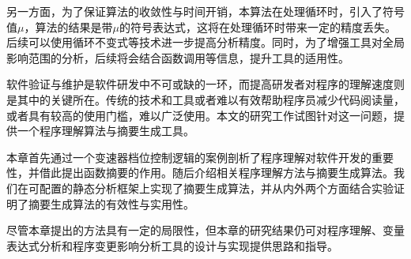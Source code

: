 另一方面，为了保证算法的收敛性与时间开销，本算法在处理循环时，引入了符号值$ \mu $，算法的结果是带$ \mu $的符号表达式，这将在处理循环时带来一定的精度丢失。后续可以使用循环不变式等技术进一步提高分析精度。同时，为了增强工具对全局影响范围的分析，后续将会结合函数调用等信息，提升工具的适用性。

软件验证与维护是软件研发中不可或缺的一环，而提高研发者对程序的理解速度则是其中的关键所在。传统的技术和工具或者难以有效帮助程序员减少代码阅读量，或者具有较高的使用门槛，难以广泛使用。本文的研究工作试图针对这一问题，提供一个程序理解算法与摘要生成工具。

本章首先通过一个变速器档位控制逻辑的案例剖析了程序理解对软件开发的重要性，并借此提出函数摘要的作用。随后介绍相关程序理解方法与摘要生成算法。我们在可配置的静态分析框架上实现了摘要生成算法，并从内外两个方面结合实验证明了摘要生成算法的有效性与实用性。

尽管本章提出的方法具有一定的局限性，但本章的研究结果仍可对程序理解、变量表达式分析和程序变更影响分析工具的设计与实现提供思路和指导。